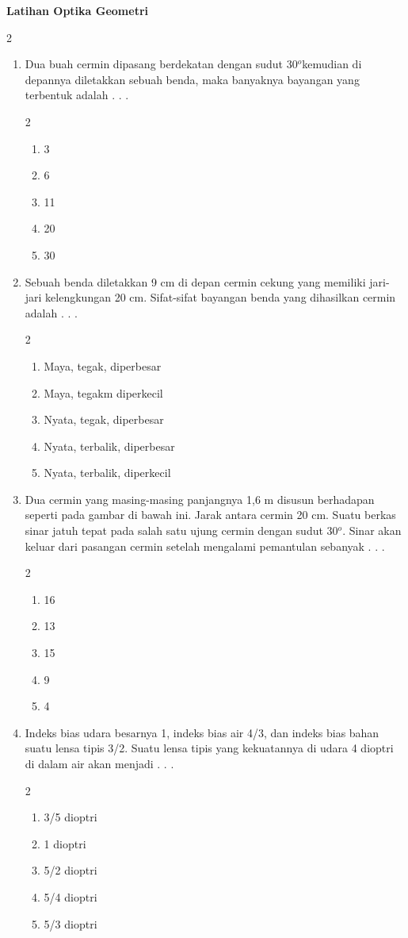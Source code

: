 \documentclass[10pt,a4paper]{extarticle}
\newcommand{\pilgani}[1]{                            \vspace{-0.3cm}\begin{multicols}{2}
 \begin{enumerate}[label=\Alph*., itemsep=0pt,topsep=0pt,leftmargin=*,align=Center]#1                     \end{enumerate}
 \phantom{ini cuma sapi, wedus, dan ayam}
 \end{multicols}}
\begin{document}
 \textbf{Latihan Optika Geometri} \phantom{ini nama siswa yang aaamengerjakan soal kuis ini }  

\begin{multicols*}{2}

\begin{enumerate}
\item Dua buah cermin dipasang berdekatan dengan sudut 30$^o$kemudian di depannya diletakkan sebuah benda, maka banyaknya bayangan yang terbentuk adalah . . .
\pilgani{
	\item 3
	\item 6
	\item 11
	\item 20
	\item 30
}
\vspace{2cm}

\item Sebuah benda diletakkan 9 cm di depan cermin cekung yang memiliki jari-jari kelengkungan 20 cm. Sifat-sifat bayangan benda yang dihasilkan cermin adalah . . . 
\pilgani{
	\item Maya, tegak, diperbesar
	\item Maya, tegakm diperkecil
	\item Nyata, tegak, diperbesar
	\item Nyata, terbalik, diperbesar
	\item Nyata, terbalik, diperkecil
}
\vspace{3cm}

\item Dua cermin yang masing-masing panjangnya 1,6 m disusun berhadapan seperti pada gambar di bawah ini. Jarak antara cermin 20 cm. Suatu berkas sinar jatuh tepat pada salah satu ujung cermin dengan sudut 30$^o$. Sinar akan keluar dari pasangan cermin setelah mengalami pemantulan sebanyak . . . 
\pilgani{
	\item 16
	\item 13
	\item 15
	\item 9
	\item 4
}
\vspace{4cm}

\item Indeks bias udara besarnya 1, indeks bias air 4/3, dan indeks bias bahan suatu lensa tipis 3/2. Suatu lensa tipis yang kekuatannya di udara 4 dioptri di dalam air akan menjadi . . . 
\pilgani{
	\item 3/5 dioptri
	\item 1 dioptri
	\item 5/2 dioptri
	\item 5/4 dioptri
	\item 5/3 dioptri
}
\vspace{3cm}


\end{enumerate}
\end{multicols*}
\end{document}
